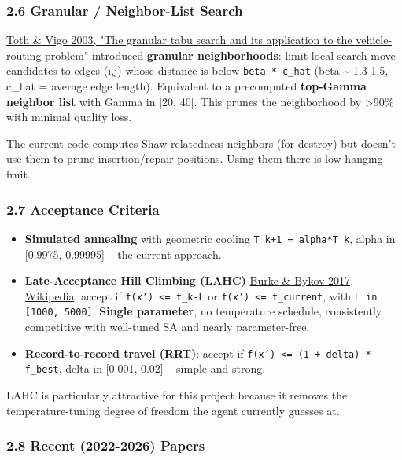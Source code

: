 \documentclass[twocolumn,10pt,letterpaper]{article}
\begin{document}
\subsubsection{2.6 Granular / Neighbor-List Search}

\href{https://pubsonline.informs.org/doi/10.1287/ijoc.15.4.333.24890}{Toth \& Vigo 2003, "The granular tabu search and its application to the vehicle-routing problem"} introduced \textbf{granular neighborhoods}: limit local-search move candidates to edges (i,j) whose distance is below \texttt{beta * c\_hat} (beta \textasciitilde{} 1.3-1.5, c\_hat = average edge length). Equivalent to a precomputed \textbf{top-Gamma neighbor list} with Gamma in [20, 40]. This prunes the neighborhood by >90\% with minimal quality loss.


The current code computes Shaw-relatedness neighbors (for destroy) but doesn't use them to prune insertion/repair positions. Using them there is low-hanging fruit.


\subsubsection{2.7 Acceptance Criteria}

\begin{itemize}
\setlength{\itemsep}{0pt}
\setlength{\parskip}{0pt}
  \item \textbf{Simulated annealing} with geometric cooling \texttt{T\_{k+1} = alpha*T\_k}, alpha in [0.9975, 0.99995] -- the current approach.
  \item \textbf{Late-Acceptance Hill Climbing (LAHC)} \href{https://www.sciencedirect.com/science/article/abs/pii/S0377221716305495}{Burke \& Bykov 2017}, \href{https://en.wikipedia.org/wiki/Late\_acceptance\_hill\_climbing}{Wikipedia}: accept if \texttt{f(x') <= f\_{k-\allowbreak L}} or \texttt{f(x') <= f\_current}, with \texttt{L in [1000, 5000]}. \textbf{Single parameter}, no temperature schedule, consistently competitive with well-tuned SA and nearly parameter-free.
  \item \textbf{Record-to-record travel (RRT)}: accept if \texttt{f(x') <= (1 + delta) * f\_best}, delta in [0.001, 0.02] -- simple and strong.
\end{itemize}

LAHC is particularly attractive for this project because it removes the temperature-tuning degree of freedom the agent currently guesses at.


\subsubsection{2.8 Recent (2022-2026) Papers}
\end{document}

